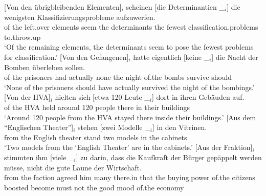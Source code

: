 \begin{sloppypar}
\eal
\ex 
\gll {}[Von den übrigbleibenden Elementen]$_i$ scheinen [die Determinantien \_$_i$] die wenigsten Klassifizierungsprobleme aufzuwerfen.\footnotemark\\
     \spacebr{}of the left.over elements seem \spacebr{}the determinants {} the fewest classification.problems to.throw.up\\
\glt `Of the remaining elements, the determinants seem to pose the fewest problems for classification.'
\ex 
\gll {}[Von den Gefangenen]$_i$ hatte eigentlich [keine \_$_i$] die Nacht der Bomben überleben sollen.\footnotemark\label{bsp-von-den-gefangenen}\\
	 {}\spacebr{}of the prisoners had actually \spacebr{}none {} the night of.the bombs survive should\\
\glt `None of the prisoners should have actually survived the night of the bombings.'
\ex 
\gll {}[Von der HVA]$_i$ hielten sich [etwa 120 Leute \_$_i$] dort in ihren Gebäuden auf.\footnotemark\\
	 {}\spacebr{}of the HVA held  \spacebr{}around 120 people {} there in their buildings \prt{}\\
\glt `Around 120 people from the HVA stayed there inside their buildings.'
\ex 
\gll {}[Aus dem "`Englischen Theater"']$_i$ stehen [zwei Modelle \_$_i$] in den Vitrinen.\footnotemark\\
	 {}\spacebr{}from the English theater stand \spacebr{}two models {} in the cabinets\\
\glt `Two models from the `English Theater' are in the cabinets.'
\ex 
\gll {}[Aus der Fraktion]$_i$ stimmten ihm [viele \_$_i$] zu darin, dass die Kaufkraft der Bürger gepäppelt werden müsse, nicht die gute Laune der Wirtschaft.\footnotemark\\
	 {}\spacebr{}from the faction agreed him \spacebr{}many {} \prt{} there.in that the buying.power of.the citizens boosted become must not the good mood of.the economy\\

\end{sloppypar}
